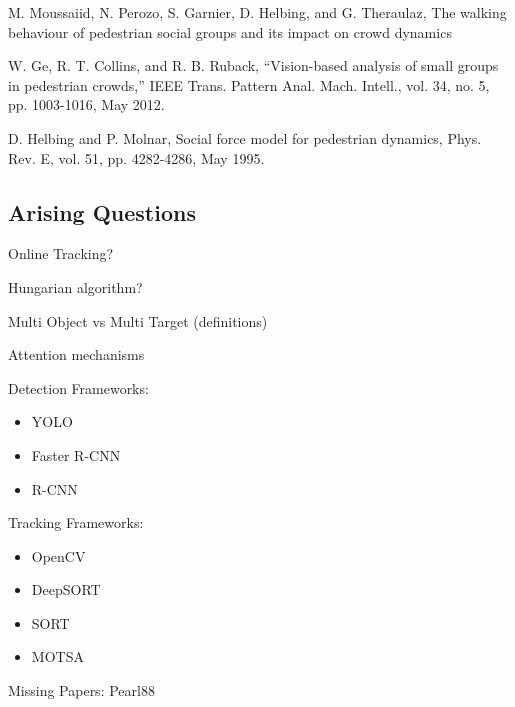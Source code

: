 M. Moussaiid, N. Perozo, S. Garnier, D. Helbing, and G. Theraulaz, The walking behaviour of pedestrian social groups and its impact on crowd dynamics

W. Ge, R. T. Collins, and R. B. Ruback, “Vision-based analysis of small groups in pedestrian crowds,” IEEE Trans. Pattern Anal. Mach. Intell., vol. 34, no. 5, pp. 1003-1016, May 2012.

D. Helbing and P. Molnar, Social force model for pedestrian dynamics, Phys. Rev. E, vol. 51, pp. 4282-4286, May 1995.

\subsection{Arising Questions}

Online Tracking?

Hungarian algorithm?

Multi Object vs Multi Target (definitions)

Attention mechanisms

Detection Frameworks:
\begin{itemize}
	\item YOLO
	\item Faster R-CNN
	\item R-CNN
\end{itemize}

Tracking Frameworks:
\begin{itemize}
	\item OpenCV
	\item DeepSORT
	\item SORT
	\item MOTSA
\end{itemize}

Missing Papers:
Pearl88
